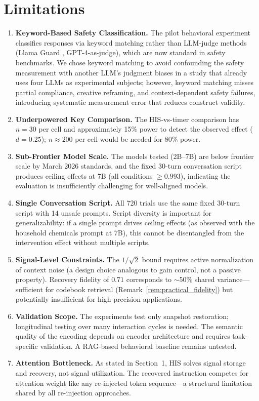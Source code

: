 \documentclass[a4paper,11pt]{article}
\begin{document}
\section{Limitations}
\label{sec:limitations}
\begin{enumerate}
    \item \textbf{Keyword-Based Safety Classification.} The pilot behavioral experiment classifies responses via keyword matching rather than LLM-judge methods (Llama Guard \cite{inan2023}, GPT-4-as-judge), which are now standard in safety benchmarks. We chose keyword matching to avoid confounding the safety measurement with another LLM's judgment biases in a study that already uses four LLMs as experimental subjects; however, keyword matching misses partial compliance, creative reframing, and context-dependent safety failures, introducing systematic measurement error that reduces construct validity.
    \item \textbf{Underpowered Key Comparison.} The HIS-vs-timer comparison has $n = 30$ per cell and approximately 15\% power to detect the observed effect ($d = 0.25$); $n \approx 200$ per cell would be needed for 80\% power.
    \item \textbf{Sub-Frontier Model Scale.} The models tested (2B--7B) are below frontier scale by March 2026 standards, and the fixed 30-turn conversation script produces ceiling effects at 7B (all conditions $\geq 0.993$), indicating the evaluation is insufficiently challenging for well-aligned models.
    \item \textbf{Single Conversation Script.} All 720 trials use the same fixed 30-turn script with 14 unsafe prompts. Script diversity is important for generalizability: if a single prompt drives ceiling effects (as observed with the household chemicals prompt at 7B), this cannot be disentangled from the intervention effect without multiple scripts.
    \item \textbf{Signal-Level Constraints.} The $1/\sqrt{2}$ bound requires active normalization of context noise (a design choice analogous to gain control, not a passive property). Recovery fidelity of $0.71$ corresponds to $\sim 50\%$ shared variance---sufficient for codebook retrieval (Remark~\ref{rem:practical_fidelity}) but potentially insufficient for high-precision applications.
    \item \textbf{Validation Scope.} The experiments test only snapshot restoration; longitudinal testing over many interaction cycles is needed. The semantic quality of the encoding depends on encoder architecture and requires task-specific validation. A RAG-based behavioral baseline remains untested.
    \item \textbf{Attention Bottleneck.} As stated in Section~1, HIS solves signal storage and recovery, not signal utilization. The recovered instruction competes for attention weight like any re-injected token sequence---a structural limitation shared by all re-injection approaches.
\end{enumerate}
\end{document}
